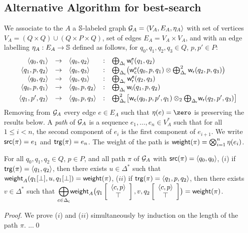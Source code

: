 %

\subsection*{Alternative Algorithm for best-search}
We associate to the \SWVPA $A$ a $\mathbb{S}$-labeled graph
$\G_A = \< V_A, E_A, \eta_A >$
with set of vertices $V_A = (Q \times Q) \cup (Q \times P \times Q)$,
set of edges $E_A = V_A \times V_A$, and with an edge labelling  
$\eta_A : E_A \to \mathbb{S}$ defined as follows,
for $q_0, q_1, q_2, q_3 \in Q$, $p, p' \in P$:
%
\[
\begin{array}{rclcl}
\< q_0, q_1> & \to & \< q_0, q_2> & : &
\bigoplus_{\Deltai} \weiei(q_1, q_2)\\
%
\< q_1, p, q_2> & \to & \<q_0, q_3> & : &
\bigoplus_{\Deltac} \bigl( \weiec(q_0, p, q_1) \otimes \bigoplus^2_{\Deltar} \weir(q_2, p, q_3)\bigr)\\ 
%
\< q_0, q_2> & \to & \< q_0, q_3> & : & 
\bigoplus_{\Deltar} \weier(q_2, q_3)\\
% 
\< q_0, p, q_1> & \to & \< q_0, p, q_2> & : &
\bigoplus_{\Deltai} \weii(q_1, p, q_2)\\[1mm]
%
\< q_1, p', q_2> & \to & \< q_0, p, q_3> & : &
\bigoplus^2_{\Deltac} \bigl[ \weic(q_0, p, p', q_1) \otimes_2 {\bigoplus_{\Deltar}} \weir(q_2, p', q_3) \bigr]\\
\end{array}
\]
Removing from $\mathcal{G}_A$ every edge $e \in E_A$ such that $\eta(e) = \zero$ 
is preserving the results below.
%
A \emph{path} of $\mathcal{G}_A$ is a sequence $e_1,\ldots, e_n \in V^*_A$ such that 
for all $1 \leq i < n$, the second component of $e_i$ is the first component of $e_{i+1}$.
We write $\mathsf{src}(\pi) = e_1$ and $\mathsf{trg}(\pi) = e_n$.
The weight of the path is $\mathsf{weight}(\pi) = \bigotimes_{i=1}^{n} \eta(e_i)$.

\begin{lemma}[Correctness]
For all $q_0, q_1, q_2 \in Q$, $p\in P$, 
and all path $\pi$ of $\mathcal{G}_A$ with $\src(\pi) = \<q_0, q_0>$,
($i$) if $\trg(\pi) = \< q_1, q_2>$, 
then there exists $u \in \Delta^*$ such that 
$\mathsf{weight}_A(q_1[\bot], u, q_1[\bot]) = \mathsf{weight}(\pi)$,
%
($ii$) if $\trg(\pi) = \< q_1, p, q_2>$,
then there exists $v \in \Delta^*$ such that 
${\displaystyle\bigoplus_{c \in \Deltac}}
 \weight_A\bigl(\configup{q_1}{\< c, p> \stackup \top }, v, \configup{q_2}{\<c, p> \stackup \top}\bigr)
 = \weight(\pi)$.
\end{lemma}
%
\begin{proof}
We prove ($i$) and ($ii$) simultaneously by induction on the length of the path $\pi$.
...\qed
\end{proof}



